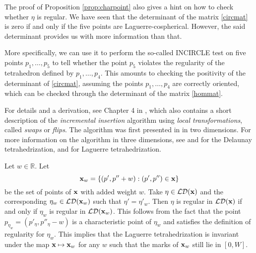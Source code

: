 \begin{remark}\label{r:construct}
	The proof of Proposition \ref{prop:charpoint} also gives a hint on how to check whether $\eta$ is regular. We have seen that the determinant of the matrix \eqref{circmat} is zero if and only if the five points are Laguerre-cospherical. However, the said determinant provides us with more information than that. 
	
	More specifically, we can use it to perform the so-called INCIRCLE test on five points $p_1,\dots, p_5$ to tell whether the point $p_5$ violates the regularity of the tetrahedron defined by $p_1,\dots, p_4$. This amounts to checking the positivity of the determinant of \eqref{circmat}, assuming the points $p_1,\dots, p_4$ are correctly oriented, which can be checked through the determinant of the matrix \eqref{hommat}. 
	
	For details and a derivation, see Chapter 4 in \cite{Gavrilova}, which also contains a short description of the \textit{incremental insertion} algorithm using \textit{local transformations}, called \textit{swaps} or \textit{flips}. The algorithm was first presented in \cite{Lawson72} in two dimensions. For more information on the algorithm in three dimensions, see \cite{Joe89} and \cite{Joe91} for the Delaunay tetrahedrization, and \cite{Edelsbrunner1996} for Laguerre tetrahedrization.
\end{remark}



\begin{remark}\label{rem:invariance}
	Let $w\in \mathbb R$. Let
	$${\mathbf{x}}_w = \{(p',p''+w): (p',p'')\in{\mathbf{x}}\}$$ be the set of points of ${\mathbf{x}}$ with added weight $w$. Take $\eta \in \mathcal {LD}({\mathbf{x}})$ and the corresponding $\eta_w \in \mathcal {LD}({\mathbf{x}}_w)$ such that $\eta'= \eta'_w$. Then $\eta$ is regular in $\mathcal {LD}({\mathbf{x}})$ if and only if $\eta_w$ is  regular in $\mathcal {LD}({\mathbf{x}}_w)$. This follows from the fact that the point $p_{\eta_w} = (p'_{\eta}, p''_{\eta} -w)$ is a characteristic point of $\eta_w$ and satisfies the definition of regularity for $\eta_w$. This implies that the Laguerre tetrahedrization is invariant under the map ${\mathbf{x}} \mapsto {\mathbf{x}}_w$ for any $w$ such that the marks of ${\mathbf{x}}_w$ still lie in $[0,W]$.
\end{remark}

